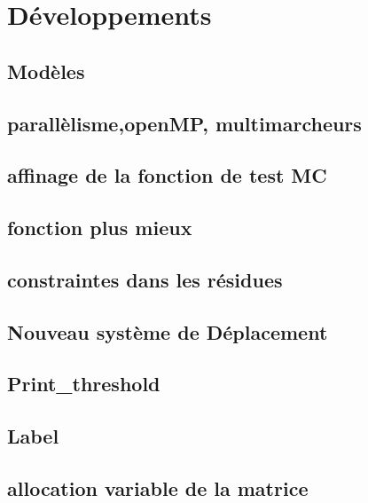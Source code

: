 \chapter{Développements}
\label{chap:developpements}

\section{Modèles}

\section{parallèlisme,openMP, multimarcheurs}

\section{affinage de la fonction de test MC}
\section{fonction plus mieux}
\section{constraintes dans les résidues}
\section{Nouveau système de Déplacement}
\section{Print\_threshold}
\section{Label}
\section{allocation variable de la matrice}

\clearpage


